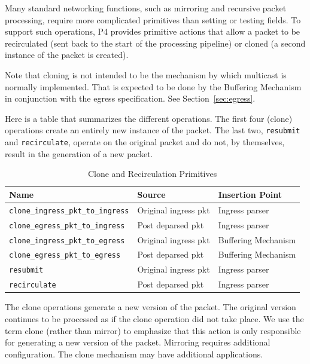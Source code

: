 \documentclass[12pt]{article}
\begin{document}

Many standard networking functions, such as mirroring and recursive packet
processing, require more complicated primitives than setting or testing fields.
To support such operations, P4 provides primitive actions that allow a packet
to be recirculated (sent back to the start of the processing pipeline) or
cloned (a second instance of the packet is created).

Note that cloning is not intended to be the mechanism by which multicast is
normally implemented. That is expected to be done by the Buffering Mechanism
in conjunction with the egress specification. See Section~\ref{sec:egress}.

Here is a table that summarizes the different operations.  The first four
(clone) operations create an entirely new instance of the packet.  The last
two, \texttt{resubmit} and \texttt{recirculate}, operate on the original packet and do not,
by themselves, result in the generation of a new packet.

\begin{table}[H]
\begin{center}
\begin{tabular}{| l | l | l |} \hline
\textbf{Name} &
\textbf{Source} &
\textbf{Insertion Point} \\ \hline
\texttt{clone_ingress_pkt_to_ingress} &
Original ingress pkt &
Ingress parser \\ \hline
\texttt{clone_egress_pkt_to_ingress} &
Post deparsed pkt &
Ingress parser \\ \hline
\texttt{clone_ingress_pkt_to_egress} &
Original ingress pkt &
Buffering Mechanism \\ \hline
\texttt{clone_egress_pkt_to_egress} &
Post deparsed pkt &
Buffering Mechanism \\ \hline
\texttt{resubmit} &
Original ingress pkt &
Ingress parser \\ \hline
\texttt{recirculate} &
Post deparsed pkt &
Ingress parser \\ \hline
\end{tabular}
\end{center}
\caption{Clone and Recirculation Primitives}
\label{tab:clonerecircprimitives}
\end{table}


The clone operations generate a new version of the packet. The original version
continues to be processed as if the clone operation did not take place. We
use the term clone (rather than mirror) to emphasize that this action is only
responsible for generating a new version of the packet. Mirroring requires
additional configuration. The clone mechanism may have additional applications.
\end{document}
